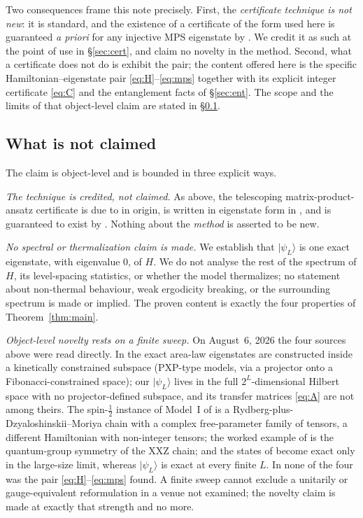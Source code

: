 \documentclass[11pt]{amsart}
\newcommand{\ket}[1]{\lvert #1 \rangle}
\newcommand{\psiL}{\ket{\psi_L}}
\theoremstyle{plain}
\theoremstyle{definition}
\theoremstyle{remark}
\begin{document}
Two consequences frame this note precisely. First, the \emph{certificate
technique is not new}: it is standard, and the existence of a certificate
of the form used here is guaranteed \emph{a priori} for any injective MPS
eigenstate by \cite{GRMSV26}. We credit it as such at the point of use in
\S\ref{sec:cert}, and claim no novelty in the method. Second, what a
certificate does not do is exhibit the pair; the content offered here is the
specific Hamiltonian--eigenstate pair \eqref{eq:H}--\eqref{eq:mps} together
with its explicit integer certificate \eqref{eq:C} and the entanglement
facts of \S\ref{sec:ent}. The scope and the limits of that object-level
claim are stated in \S\ref{ssec:notclaimed}.

\subsection{What is not claimed}\label{ssec:notclaimed}
The claim is object-level and is bounded in three explicit ways.

\emph{The technique is credited, not claimed.} As above, the telescoping
matrix-product-ansatz certificate is due to \cite{DEHP93} in origin, is
written in eigenstate form in \cite{GE26}, and is guaranteed to exist by
\cite{GRMSV26}. Nothing about the \emph{method} is asserted to be new.

\emph{No spectral or thermalization claim is made.} We establish that
$\psiL$ is one exact eigenstate, with eigenvalue $0$, of $H$. We do not
analyse the rest of the spectrum of $H$, its level-spacing statistics, or
whether the model thermalizes; no statement about non-thermal behaviour,
weak ergodicity breaking, or the surrounding spectrum is made or implied.
The proven content is exactly the four properties of
Theorem~\ref{thm:main}.

\emph{Object-level novelty rests on a finite sweep.} On August~6, 2026 the
four sources above were read directly. In \cite{IM25} the exact area-law
eigenstates are constructed inside a kinetically constrained subspace
(PXP-type models, via a projector onto a Fibonacci-constrained space); our
$\psiL$ lives in the full $2^L$-dimensional Hilbert space with no
projector-defined subspace, and its transfer matrices \eqref{eq:A} are not
among theirs. The spin-$\tfrac12$ instance of Model~I of \cite{GE26} is a
Rydberg-plus-Dzyaloshinskii--Moriya chain with a complex free-parameter
family of tensors, a different Hamiltonian with non-integer tensors; the
worked example of \cite{GRMSV26} is the quantum-group symmetry of the XXZ
chain; and the states of \cite{PGCGB20} become exact only in the large-size
limit, whereas $\psiL$ is exact at every finite $L$. In none of the four was
the pair \eqref{eq:H}--\eqref{eq:mps} found. A finite sweep cannot exclude
a unitarily or gauge-equivalent reformulation in a venue not examined; the
novelty claim is made at exactly that strength and no more.
\end{document}
